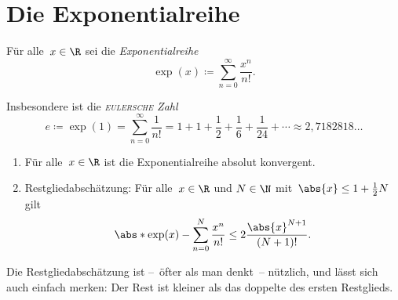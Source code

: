 \documentclass[a4paper]{article}
\begin{document}
\section{Die Exponentialreihe}

\begin{definition}
    Für alle~$x \in \R$ sei die \emph{Exponentialreihe}
    \begin{equation*}
        \exp(x) \coloneqq \sum_{n=0}^\infty \frac{x^n}{n!}.
    \end{equation*}

    Insbesondere ist die \emph{\textsc{eulersche} Zahl}
    \begin{equation*}
        e \coloneqq \exp(1) = \sum_{n=0}^\infty \frac{1}{n!} = 1 + 1 + \frac{1}{2} + \frac{1}{6} + \frac{1}{24} + \cdots \approx 2,7182818\dots
    \end{equation*}
\end{definition}

\begin{theorem}\leavevmode
    \begin{enumerate}
        \item Für alle~$x \in \R$ ist die Exponentialreihe absolut konvergent.
        \item Restgliedabschätzung: Für alle~$x \in \R$ und $N \in \N$ mit~$\abs{x} \leq 1+\frac{1}{2}N$ gilt
        \begin{equation*}
            \abs*{\exp(x) - \sum_{n=0}^N \frac{x^n}{n!}} \leq 2 \frac{\abs{x}^{N+1}}{(N+1)!}.
        \end{equation*}
    \end{enumerate}
\end{theorem}

Die Restgliedabschätzung ist --~öfter als man denkt~-- nützlich, und lässt sich auch einfach merken: Der Rest ist kleiner als das doppelte des ersten Restglieds.
\end{document}
